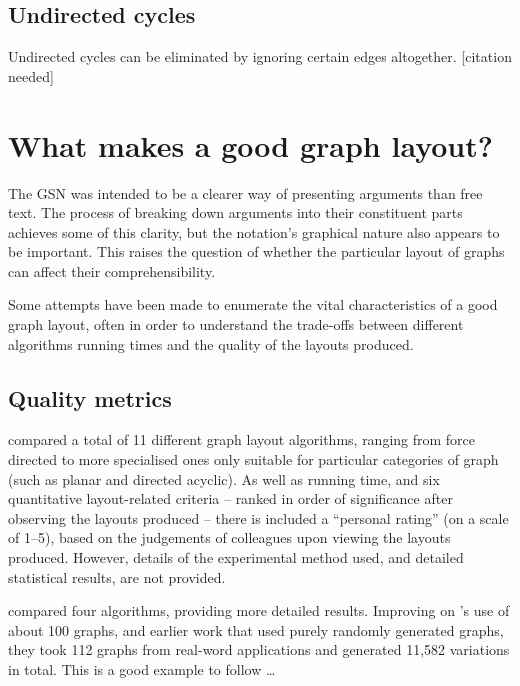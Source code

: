 \subsection{Undirected cycles}

Undirected cycles can be eliminated by ignoring certain edges altogether.  [citation needed]




\section{What makes a good graph layout?}

The GSN was intended to be a clearer way of presenting arguments than free text.
The process of breaking down arguments into their constituent parts achieves some of this clarity,
but the notation's graphical nature also appears to be important.
This raises the question of whether the particular layout of graphs can affect their comprehensibility.

Some attempts have been made to enumerate the vital characteristics of a good graph layout, often in order to understand the trade-offs between different algorithms running times and the quality of the layouts produced.


\subsection{Quality metrics}

\citet{Himsolt95comparingand} compared a total of 11 different graph layout algorithms, ranging from force directed to more specialised ones only suitable for particular categories of graph (such as planar and directed acyclic).
As well as running time, and six quantitative layout-related criteria -- ranked in order of significance after observing the layouts produced -- there is included a ``personal rating'' (on a scale of 1--5), based on the judgements of colleagues upon viewing the layouts produced.
However, details of the experimental method used, and detailed statistical results, are not provided.

\citet{DiBattista1997303} compared four algorithms, providing more detailed results.
Improving on \citeauthor{Himsolt95comparingand}'s use of about 100 graphs, and earlier work  that used purely randomly generated graphs, they took 112 graphs from real-word applications and generated 11,582 variations in total. This is a good example to follow \ldots

